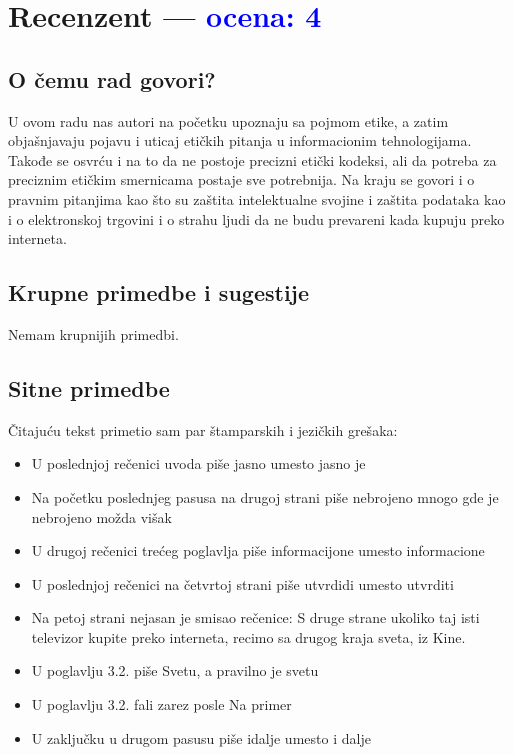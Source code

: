 \documentclass[a4paper]{report}
\newcommand{\odgovor}[1]{\textcolor{blue}{#1}}
\begin{document}
\chapter{Recenzent \odgovor{--- ocena: 4} }


\section{O čemu rad govori?}
U ovom radu nas autori na početku upoznaju sa pojmom etike, a zatim objašnjavaju pojavu i uticaj etičkih pitanja u informacionim tehnologijama. Takođe se 
osvrću i na to da ne postoje precizni etički kodeksi, ali da potreba za preciznim etičkim smernicama postaje sve potrebnija. Na kraju se govori i o pravnim
pitanjima kao što su zaštita intelektualne svojine i zaštita podataka kao i o elektronskoj trgovini i o strahu ljudi da ne budu prevareni kada kupuju preko interneta.

\section{Krupne primedbe i sugestije}
Nemam krupnijih primedbi.

\section{Sitne primedbe}
Čitajuću tekst primetio sam par štamparskih i jezičkih grešaka:
\begin{itemize}
\item U poslednjoj rečenici uvoda piše jasno umesto jasno je
\item Na početku poslednjeg pasusa na drugoj strani piše nebrojeno mnogo gde je nebrojeno možda višak
\item U drugoj rečenici trećeg poglavlja piše informacijone umesto informacione
\item U poslednjoj rečenici na četvrtoj strani piše utvrdidi umesto utvrditi
\item Na petoj strani nejasan je smisao rečenice: S druge strane ukoliko taj
isti televizor kupite preko interneta, recimo sa drugog kraja sveta, iz Kine.
\item U poglavlju 3.2. piše Svetu, a pravilno je svetu
\item U poglavlju 3.2. fali zarez posle Na primer
\item U zaključku u drugom pasusu piše idalje umesto i dalje
\end{itemize}
\end{document}
